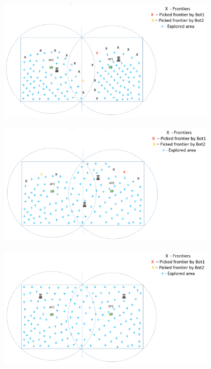 \begin{figure}
\begin{subfigure}[b]{0.495\textwidth}
		\label{subfig:c} 
		\caption{}
	\end{subfigure}
	\begin{subfigure}[b]{0.495\textwidth}
		\includegraphics[width=\textwidth, height=0.6\textwidth]{images/wm4.png}
		\label{subfig:d}
		\caption{}
	\end{subfigure}
    \begin{subfigure}[b]{0.495\textwidth}
		\includegraphics[width=\textwidth, height=0.6\textwidth]{images/wm5.png}
		\label{subfig:e} 
		\caption{}
	\end{subfigure}
	\begin{subfigure}[b]{0.495\textwidth}
		\includegraphics[width=\textwidth, height=0.6\textwidth]{images/wm6.png}

\end{subfigure}
\end{figure}
